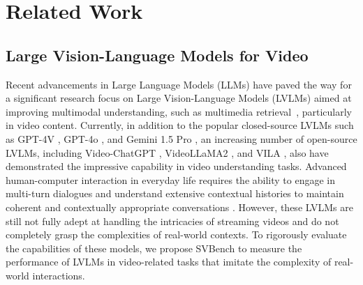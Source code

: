 \section{Related Work}
\subsection{Large Vision-Language Models for Video}
Recent advancements in Large Language Models (LLMs) have paved the way for a significant research focus on Large Vision-Language Models (LVLMs) aimed at improving multimodal understanding, such as multimedia retrieval~\cite{yang2024ldre,yang2024semantic}, particularly in video content.
%
Currently, in addition to the popular closed-source LVLMs such as GPT-4V \cite{yang2023dawn}, GPT-4o \cite{achiam2023gpt}, and Gemini 1.5 Pro \cite{reid2024gemini}, an increasing number of open-source LVLMs, including Video-ChatGPT \cite{maaz2023video}, VideoLLaMA2 \cite{cheng2024videollama}, and VILA \cite{lin2024vila}, also have demonstrated the impressive capability in video understanding tasks. 
%
Advanced human-computer interaction in everyday life requires the ability to engage in multi-turn dialogues and understand extensive contextual histories to maintain coherent and contextually appropriate conversations \cite{qian2024streaming, chen2024videollm}.
%
However, these LVLMs are still not fully adept at handling the intricacies of streaming videos and do not completely grasp the complexities of real-world contexts.
%
%
% 
To rigorously evaluate the capabilities of these models, we propose SVBench to measure the performance of LVLMs in video-related tasks that imitate the complexity of real-world interactions.

